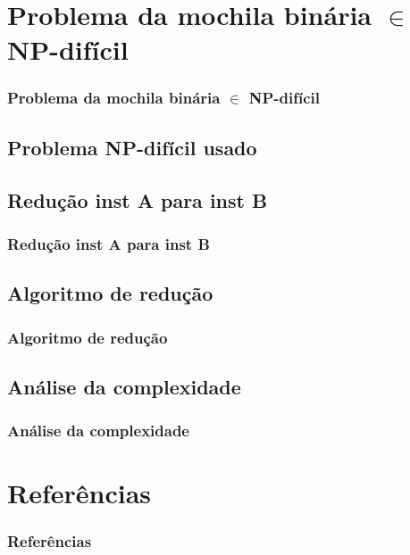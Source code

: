 \documentclass{beamer}
\begin{document}
\section{Problema da mochila binária $\in$ NP-difícil}
\begin{frame}
\frametitle{Problema da mochila binária $\in$ NP-difícil}
\end{frame}

\subsection{Problema NP-difícil usado}
\begin{frame}
\frametitle{}
\end{frame}

\subsection{Redução inst A para inst B}
\begin{frame}
\frametitle{Redução inst A para inst B}
\end{frame}

\subsection{Algoritmo de redução}
\begin{frame}
\frametitle{Algoritmo de redução}
\end{frame}

\subsection{Análise da complexidade}
\begin{frame}
\frametitle{Análise da complexidade}
\end{frame}

\section{Referências}
\begin{frame}
\frametitle{Referências}
\end{frame}
\end{document}
